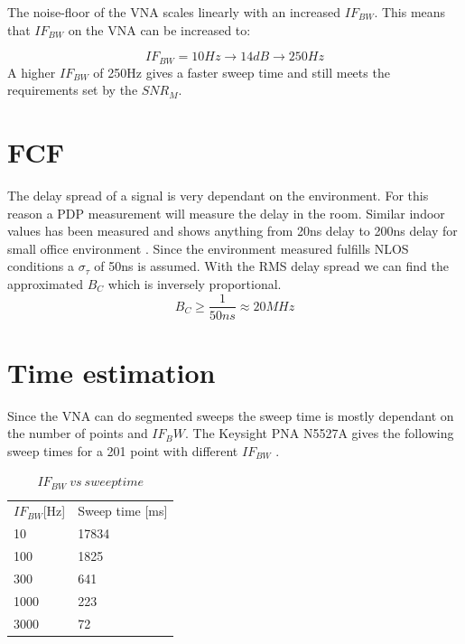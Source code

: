 The noise-floor of the \gls{VNA} scales linearly with an increased $IF_{BW}$\citep{PNA_scale}. This means that $IF_{BW}$ on the \gls{VNA} can be increased to:

\begin{equation}
IF_{BW} = 10Hz \rightarrow 14dB \rightarrow 250Hz
\end{equation}
A higher $IF_{BW}$ of 250Hz  gives a faster sweep time and still meets the requirements set by the $SNR_M$.
\section{FCF}
The delay spread of a signal is very dependant on the environment. For this reason a PDP measurement will measure the delay in the room. Similar indoor values has been measured and shows anything from 20ns delay to 200ns delay for small office environment \citep{indoor_delay}. Since the environment measured fulfills NLOS conditions a $\sigma_{\tau}$ of 50ns is assumed. With the RMS delay spread we can find the approximated $B_C$ which is inversely proportional. 
\begin{equation}
B_C \geq \frac{1}{50ns} \approx 20MHz
\label{CohBW}
\end{equation}
\section{Time estimation}
\label{TIME_EST}
Since the \gls{VNA} can do segmented sweeps the sweep time is mostly dependant on the number of points and $IF_BW$.
The Keysight PNA N5527A gives the following sweep times for a 201 point with different $IF_{BW}$ \citep{Key_PNA}. \\

\begin{table}[H]
\centering
\caption{$IF_{BW} \ vs \ sweep time$}
\label{my-label}
\begin{tabular}{l|l}
\hline
$IF_{BW}${[}Hz{]} & Sweep time {[}ms{]} \\
10              & 17834               \\
100             & 1825                \\
300             & 641                 \\
1000            & 223                 \\
3000            & 72                 
\end{tabular}
\end{table}

